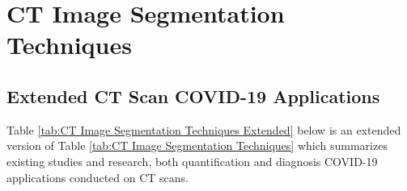 
\chapter{CT Image Segmentation Techniques} \label{CT Image Segmentation Techniques} %


\section*{Extended CT Scan COVID-19 Applications}

Table \ref{tab:CT Image Segmentation Techniques Extended} below is an extended version of Table \ref{tab:CT Image Segmentation Techniques} which summarizes existing studies and research, both quantification and diagnosis COVID-19 applications conducted on CT scans.   
\\
